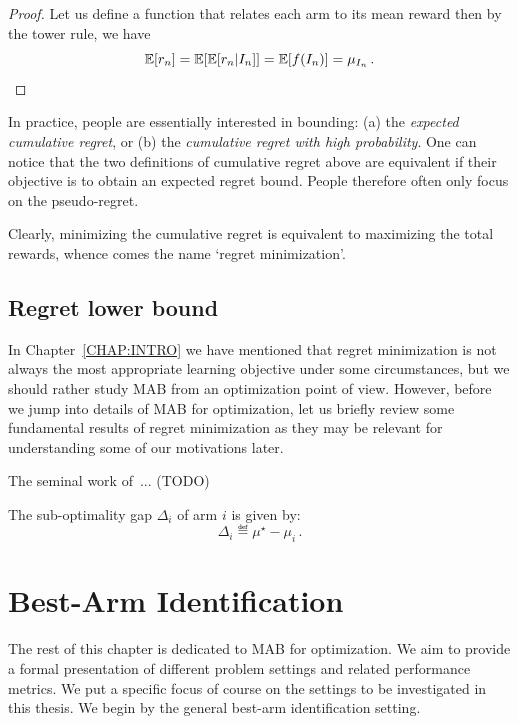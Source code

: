 \begin{proof}
	Let us define a function that relates each arm to its mean reward  then by the tower rule, we have
    \[
	    \mathbb{E}[r_n] = \mathbb{E}[\mathbb{E}[r_n|I_n]] = \mathbb{E}[f(I_n)] = \mu_{I_n}\,.
    \]
\end{proof}

In practice, people are essentially interested in bounding: (a) the \emph{expected cumulative regret}, or (b) the \emph{cumulative regret with high probability}. One can notice that the two definitions of cumulative regret above are equivalent if their objective is to obtain an expected regret bound. People therefore often only focus on the pseudo-regret.

Clearly, minimizing the cumulative regret is equivalent to maximizing the total rewards, whence comes the name `regret minimization'. 

\subsection{Regret lower bound}

In Chapter~\ref{CHAP:INTRO} we have mentioned that regret minimization is not always the most appropriate learning objective under some circumstances, but we should rather study MAB from an optimization point of view. However, before we jump into details of MAB for optimization, let us briefly review some fundamental results of regret minimization as they may be relevant for understanding some of our motivations later.

The seminal work of~\cite{robbins1952}... (TODO)

\begin{definition}\label{def:mab.gap}
\begin{leftbar}[defnbar]
The sub-optimality gap $\Delta_i$ of arm $i$ is given by:
\[
	\Delta_i \eqdef \mu^{\star} - \mu_i\,.
\]
\end{leftbar}
\end{definition}

\section{Best-Arm Identification}\label{sec:mab.bai}

The rest of this chapter is dedicated to MAB for optimization. We aim to provide a formal presentation of different problem settings and related performance metrics. We put a specific focus of course on the settings to be investigated in this thesis. We begin by the general best-arm identification setting.

